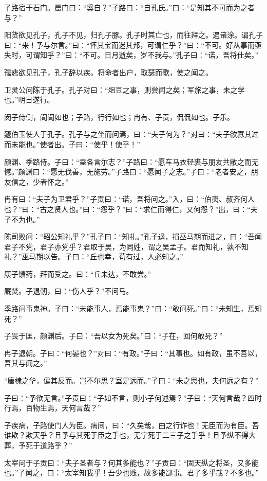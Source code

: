 \documentclass[a5paper]{ctexbook}
\begin{document}
    子路宿于石门。晨门曰：“奚自？”子路曰：“自孔氏。”曰：“是知其不可而为之者与？”

    阳货欲见孔子，孔子不见，归孔子豚。孔子时其亡也，而往拜之。遇诸涂。谓孔子曰：“来！予与尔言。”曰：“怀其宝而迷其邦，可谓仁乎？”曰：“不可。好从事而亟失时，可谓知乎？”曰：“不可。日月逝矣，岁不我与。”孔子曰：“诺，吾将仕矣。”

    孺悲欲见孔子，孔子辞以疾。将命者出户，取瑟而歌，使之闻之。

    卫灵公问陈于孔子。孔子对曰：“俎豆之事，则尝闻之矣；军旅之事，未之学也。”明日遂行。

    闵子侍侧，訚訚如也；子路，行行如也；冉有、子贡，侃侃如也。子乐。

    蘧伯玉使人于孔子。孔子与之坐而问焉，曰：“夫子何为？”对曰：“夫子欲寡其过而未能也。”使者出。子曰：“使乎！使乎！”
    
    颜渊、季路侍。子曰：“盍各言尔志？”子路曰：“愿车马衣轻裘与朋友共敝之而无憾。”颜渊曰：“愿无伐善，无施劳。”子路曰：“愿闻子之志。”子曰：“老者安之，朋友信之，少者怀之。”

    冉有曰：“夫子为卫君乎？”子贡曰：“诺，吾将问之。”入，曰：“伯夷、叔齐何人也？”曰：“古之贤人也。”曰：“怨乎？”曰：“求仁而得仁，又何怨？”出，曰：“夫子不为也。”

    陈司败问：“昭公知礼乎？”孔子曰：“知礼。”孔子退，揖巫马期而进之，曰：“吾闻君子不党，君子亦党乎？君取于吴，为同姓，谓之吴孟子。君而知礼，孰不知礼？”巫马期以告。子曰：“丘也幸，苟有过，人必知之。”

    康子馈药，拜而受之。曰：“丘未达，不敢尝。”
    
    厩焚。子退朝，曰：“伤人乎？”不问马。

    季路问事鬼神。子曰：“未能事人，焉能事鬼？”曰：“敢问死。”曰：“未知生，焉知死？”

    子畏于匡，颜渊后。子曰：“吾以女为死矣。”曰：“子在，回何敢死？”

    冉子退朝。子曰：“何晏也？”对曰：“有政。”子曰：“其事也。如有政，虽不吾以，吾其与闻之。”

    “唐棣之华，偏其反而。岂不尔思？室是远而。”子曰：“未之思也，夫何远之有？”

    子曰：“予欲无言。”子贡曰：“子如不言，则小子何述焉？”子曰：“天何言哉？四时行焉，百物生焉，天何言哉？”

    子疾病，子路使门人为臣。病间，曰：“久矣哉，由之行诈也！无臣而为有臣。吾谁欺？欺天乎？且予与其死于臣之手也，无宁死于二三子之手乎！且予纵不得大葬，予死于道路乎？”

    太宰问于子贡曰：“夫子圣者与？何其多能也？”子贡曰：“固天纵之将圣，又多能也。”子闻之，曰：“太宰知我乎！吾少也贱，故多能鄙事。君子多乎哉？不多也。”
\end{document}
